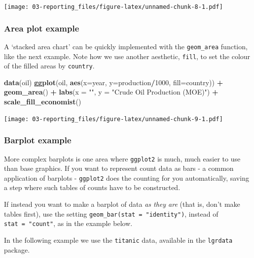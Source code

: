 \documentclass[]{book}
\newenvironment{Shaded}{\begin{snugshade}}{\end{snugshade}}
\newcommand{\DataTypeTok}[1]{\textcolor[rgb]{0.13,0.29,0.53}{#1}}
\newcommand{\DecValTok}[1]{\textcolor[rgb]{0.00,0.00,0.81}{#1}}
\newcommand{\KeywordTok}[1]{\textcolor[rgb]{0.13,0.29,0.53}{\textbf{#1}}}
\newcommand{\NormalTok}[1]{#1}
\newcommand{\OperatorTok}[1]{\textcolor[rgb]{0.81,0.36,0.00}{\textbf{#1}}}
\newcommand{\StringTok}[1]{\textcolor[rgb]{0.31,0.60,0.02}{#1}}
\begin{document}
\texttt{[image: 03-reporting\_files/figure-latex/unnamed-chunk-8-1.pdf]}

\hypertarget{area-plot-example}{%
\subsubsection{Area plot example}\label{area-plot-example}}

A `stacked area chart' can be quickly implemented with the \texttt{geom\_area} function, like the next example. Note how we use another aesthetic, \texttt{fill}, to set the colour of the filled areas by \texttt{country}.

\begin{Shaded}
\begin{Highlighting}[]
\KeywordTok{data}\NormalTok{(oil)}
\KeywordTok{ggplot}\NormalTok{(oil, }\KeywordTok{aes}\NormalTok{(}\DataTypeTok{x=}\NormalTok{year, }\DataTypeTok{y=}\NormalTok{production}\OperatorTok{/}\DecValTok{1000}\NormalTok{, }\DataTypeTok{fill=}\NormalTok{country)) }\OperatorTok{+}\StringTok{ }
\StringTok{  }\KeywordTok{geom_area}\NormalTok{() }\OperatorTok{+}\StringTok{ }
\StringTok{  }\KeywordTok{labs}\NormalTok{(}\DataTypeTok{x =} \StringTok{""}\NormalTok{, }\DataTypeTok{y =} \StringTok{"Crude Oil Production (MOE)"}\NormalTok{) }\OperatorTok{+}
\StringTok{  }\KeywordTok{scale_fill_economist}\NormalTok{()}
\end{Highlighting}
\end{Shaded}

\texttt{[image: 03-reporting\_files/figure-latex/unnamed-chunk-9-1.pdf]}

\hypertarget{barplot-example}{%
\subsubsection{Barplot example}\label{barplot-example}}

More complex barplots is one area where \texttt{ggplot2} is much, much easier to use than base graphics. If you want to represent count data as bars - a common application of barplots - \texttt{ggplot2} does the counting for you automatically, saving a step where such tables of counts have to be constructed.

If instead you want to make a barplot of data \emph{as they are} (that is, don't make tables first), use the setting \texttt{geom\_bar(stat\ =\ "identity")}, instead of \texttt{stat\ =\ "count"}, as in the example below.

In the following example we use the \texttt{titanic} data, available in the \texttt{lgrdata} package.
\end{document}
